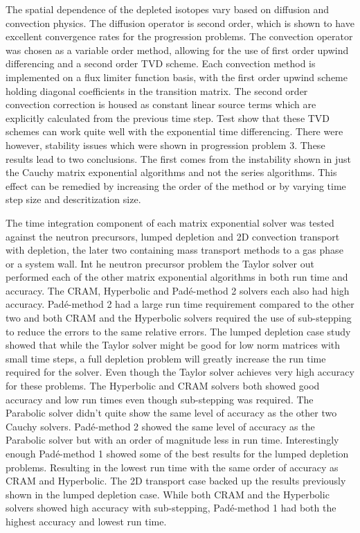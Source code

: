 The spatial dependence of the depleted isotopes vary based on diffusion and convection physics. The diffusion operator is second order, which is shown to have excellent convergence rates for the progression problems. The convection operator was chosen as a variable order method, allowing for the use of first order upwind differencing and a second order TVD scheme. Each convection method is implemented on a flux limiter function basis, with the first order upwind scheme holding diagonal coefficients in the transition matrix. The second order convection correction is housed as constant linear source terms which are explicitly calculated from the previous time step. Test show that these TVD schemes can work quite well with the exponential time differencing. There were however, stability issues which were shown in progression problem 3. These results lead to two conclusions. The first comes from the instability shown in just the Cauchy matrix exponential algorithms and not the series algorithms. This effect can be remedied by increasing the order of the method or by varying time step size and descritization size. 

The time integration component of each matrix exponential solver was tested against the neutron precursors, lumped depletion and 2D convection transport with depletion, the later two containing mass transport methods to a gas phase or a system wall. Int he neutron precursor problem the Taylor solver out performed each of the other matrix exponential algorithms in both run time and accuracy. The CRAM, Hyperbolic and Pad\'e-method 2 solvers each also had high accuracy. Pad\'e-method 2 had a large run time requirement compared to the other two and both CRAM and the Hyperbolic solvers required the use of sub-stepping to reduce the errors to the same relative errors. The lumped depletion case study showed that while the Taylor solver might be good for low norm matrices with small time steps, a full depletion problem will greatly increase the run time required for the solver. Even though the Taylor solver achieves very high accuracy for these problems. The Hyperbolic and CRAM solvers both showed good accuracy and low run times even though sub-stepping was required. The Parabolic solver didn't quite show the same level of accuracy as the other two Cauchy solvers. Pad\'e-method 2 showed the same level of accuracy as the Parabolic solver but with an order of magnitude less in run time. Interestingly enough Pad\'e-method 1 showed some of the best results for the lumped depletion problems. Resulting in the lowest run time with the same order of accuracy as CRAM and Hyperbolic. The 2D transport case backed up the results previously shown in the lumped depletion case. While both CRAM and the Hyperbolic solvers showed high accuracy with sub-stepping, Pad\'e-method 1 had both the highest accuracy and lowest run time. 


